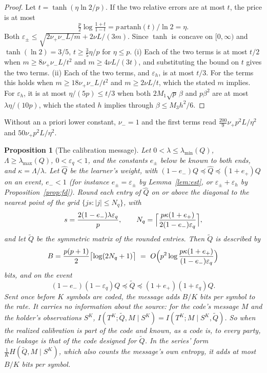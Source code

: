 \documentclass[11pt,onecolumn]{IEEEtran}
\newtheorem{proposition}[theorem]{Proposition}
\newcommand{\nup}{\nu_{+}}
\newcommand{\num}{\nu_{-}}
\newcommand{\lmin}{\lambda_{\min}}
\newcommand{\lmax}{\lambda_{\max}}
\begin{document}
\begin{proof}
Let $t=\tanh(\eta\ln2/p)$. If the two relative errors are at most $t$, the price is at
most
\[
\tfrac p2\log\tfrac{1+t}{1-t}=p\,\mathrm{artanh}(t)/\ln2=\eta .
\]
Both
$\varepsilon_\pm\le\sqrt{2\nup\num L/m}+2\nu L/(3m)$. Since $\tanh$ is concave on
$[0,\infty)$ and $\tanh(\ln2)=3/5$, $t\ge\tfrac35\eta/p$ for $\eta\le p$.
(i) Each of the two terms is at most $t/2$ when $m\ge8\nup\num L/t^2$ and
$m\ge4\nu L/(3t)$, and substituting the bound on $t$ gives the two terms.
(ii) Each of the two terms, and $\varepsilon_h$, is at most $t/3$. For the terms
this holds when $m\ge18\nup\num L/t^2$ and $m\ge2\nu L/t$, which the stated $m$
implies. For $\varepsilon_h$, it is at most $\eta/(5p)\le t/3$ when both
$2M_1\sqrt p\,\beta$ and $p\beta^2$ are at most $\lambda\eta/(10p)$, which the stated
$h$ implies through $\beta\le M_3h^2/6$.
\end{proof}

Without an a priori lower constant, $\num=1$ and the first terms read
$\tfrac{200}9\nup p^2L/\eta^2$ and $50\nup p^2L/\eta^2$.

\begin{proposition}[The calibration message]\label{prop:calib}
Let $0<\lambda\le\lmin(Q)$, $\Lambda\ge\lmax(Q)$, $0<\varepsilon_q<1$, and the constants
$e_\pm$ below be known to both ends, and $\kappa=\Lambda/\lambda$. Let $\hat Q$ be the learner's weight,
with $(1-e_-)Q\preceq\hat Q\preceq(1+e_+)Q$ on an event, $e_-<1$ (for instance
$e_\pm=\varepsilon_\pm$ by Lemma~\ref{lem:est}, or $\varepsilon_\pm+\varepsilon_h$ by
Proposition~\ref{prop:fd}). Round each entry of $\hat Q$ on or above the diagonal to the
nearest point of the grid $\{js:|j|\le N_q\}$, with
\[
s=\frac{2(1-e_-)\lambda\varepsilon_q}p,\qquad
N_q=\Bigl\lceil\frac{p\kappa(1+e_+)}{2(1-e_-)\varepsilon_q}\Bigr\rceil,
\]
and let $\tilde Q$ be the symmetric matrix of the rounded entries. Then $\tilde Q$ is
described by
\[
B=\frac{p(p+1)}2\bigl\lceil\log(2N_q+1)\bigr\rceil
\ =\ O\Bigl(p^2\log\frac{p\kappa(1+e_+)}{(1-e_-)\varepsilon_q}\Bigr)
\]
bits, and on the event
\[
(1-e_-)(1-\varepsilon_q)Q\preceq\tilde Q\preceq(1+e_+)(1+\varepsilon_q)Q .
\]
Sent once before $K$ symbols are coded, the message adds $B/K$ bits per symbol to the
rate. It carries no information about the source: for the code's message $M$ and the
holder's observations $S^K$, $I(T^K;\tilde Q,M\mid S^K)=I(T^K;M\mid S^K,\tilde Q)$. So
when the realized calibration is part of the code and known, as a code is, to every
party, the leakage is that of the code designed for $\tilde Q$. In the series' form
$\tfrac1KH(\tilde Q,M\mid S^K)$, which also counts the message's own entropy, it adds at
most $B/K$ bits per symbol.
\end{proposition}
\end{document}
